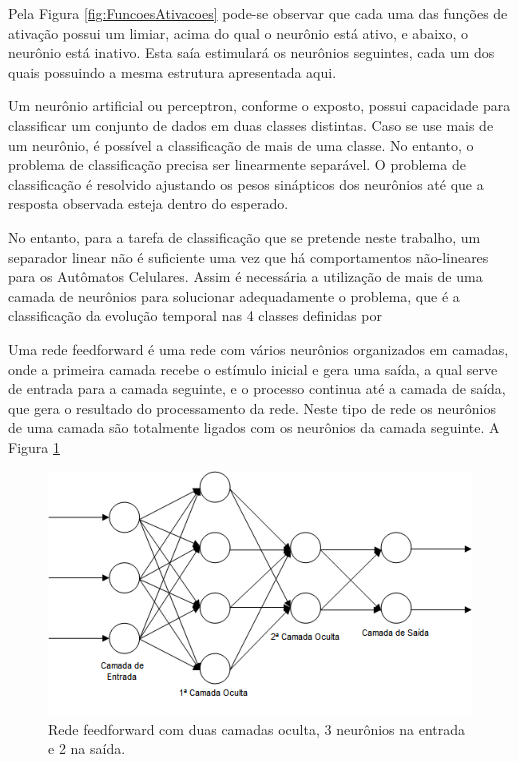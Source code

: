 \documentclass[12pt,a4paper]{report}
\begin{document}
	Pela Figura \ref{fig:FuncoesAtivacoes} pode-se observar que cada uma das funções de ativação possui um limiar, acima do qual o neurônio está ativo, e abaixo, o neurônio está inativo. Esta saía estimulará os neurônios seguintes, cada um dos quais possuindo a mesma estrutura apresentada aqui. 
	
	Um neurônio artificial ou perceptron, conforme o exposto, possui capacidade para classificar um conjunto de dados em duas classes distintas. Caso se use mais de um neurônio, é possível a classificação de mais de uma classe. No entanto, o problema de classificação precisa ser linearmente separável. O problema de classificação é resolvido ajustando os pesos sinápticos dos neurônios até que a resposta observada esteja dentro do esperado.
	
	No entanto, para a tarefa de classificação que se pretende neste trabalho, um separador linear não é suficiente uma vez que há comportamentos não-lineares para os Autômatos Celulares. Assim é necessária a utilização de mais de uma camada de neurônios para solucionar adequadamente o problema, que é a classificação da evolução temporal nas 4 classes definidas por 
	
	Uma rede feedforward é uma rede com vários neurônios organizados em camadas, onde a primeira camada recebe o estímulo inicial e gera uma saída, a qual serve de entrada para a camada seguinte, e o processo continua até a camada de saída, que gera o resultado do processamento da rede. Neste tipo de rede os neurônios de uma camada são totalmente ligados com os neurônios da camada seguinte. A Figura \ref{fig:RedeNeuralMulticamadas}
	
	\begin{figure}[H]
		\centering
		\includegraphics[scale=0.70]{./img/rede_neural_multicamadas.png}
		\caption{Rede feedforward com duas camadas oculta, 3 neurônios na entrada e 2 na saída.}
		\label{fig:RedeNeuralMulticamadas}
	\end{figure}
	
\end{document}
